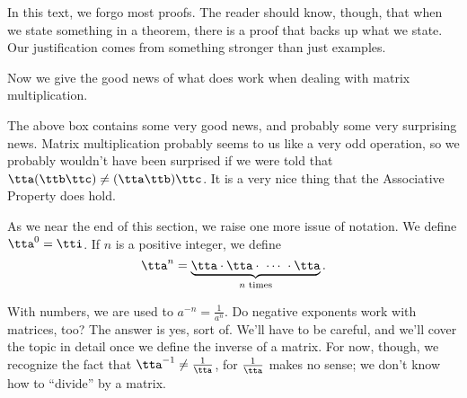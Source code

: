 In this text, we forgo most proofs. The reader should know, though, that when we state something in a theorem, there is a proof that backs up what we state. Our justification comes from something stronger than just examples.

Now we give the good news of what does work when dealing with matrix multiplication.

\smallskip


\smallskip

The above box contains some very good news, and probably some very surprising news. Matrix multiplication probably seems to us like a very odd operation, so we probably wouldn't have been surprised if we were told that $\tta(\ttb\ttc)\neq(\tta\ttb)\ttc$. It is a very nice thing that the Associative Property does hold.

As we near the end of this section, we raise one more issue of notation. We define $\tta^0 = \tti$. If $n$ is a positive integer, we define 
\[
\tta^n = \underbrace{\tta\cdot\tta\cdot \ \cdots\ \cdot\tta}_\text{\parbox{50pt}{\centering $n$ times}}.
\]

With numbers, we are used to $a^{-n} = \frac{1}{a^n}$. Do negative exponents work with matrices, too? The answer is yes, sort of. We'll have to be careful, and we'll cover the topic in detail once we define the inverse of a matrix. For now, though, we recognize the fact that $\tta^{-1} \neq \frac{1}{\tta}$, for $\frac{1}{\tta}$ makes no sense; we don't know how to ``divide'' by a matrix.\\

